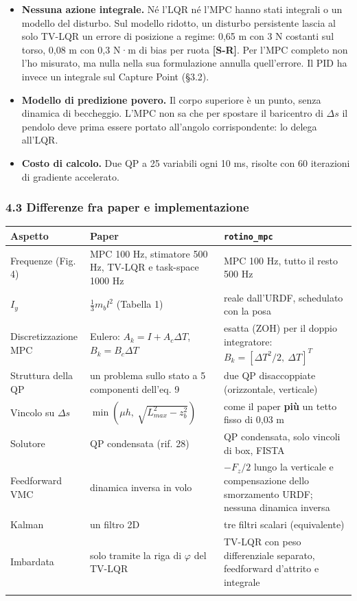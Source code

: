 \documentclass[
]{article}
\providecommand{\tightlist}{%
  \setlength{\itemsep}{0pt}\setlength{\parskip}{0pt}}
\begin{document}
\begin{itemize}
\tightlist
\item \textbf{Nessuna azione integrale.} Né l'LQR né l'MPC hanno stati integrali o un modello del disturbo. Sul modello ridotto, un disturbo persistente lascia al solo TV-LQR un errore di posizione a regime: 0,65 m con 3 N costanti sul torso, 0,08 m con 0,3 N·m di bias per ruota \textbf{[S-R]}. Per l'MPC completo non l'ho misurato, ma nulla nella sua formulazione annulla quell'errore. Il PID ha invece un integrale sul Capture Point (§3.2).
\item \textbf{Modello di predizione povero.} Il corpo superiore è un punto, senza dinamica di beccheggio. L'MPC non sa che per spostare il baricentro di \(\Delta s\) il pendolo deve prima essere portato all'angolo corrispondente: lo delega all'LQR.
\item \textbf{Costo di calcolo.} Due QP a 25 variabili ogni 10 ms, risolte con 60 iterazioni di gradiente accelerato.
\end{itemize}

\subsubsection{4.3 Differenze fra paper e implementazione}\label{43-differenze-fra-paper-e-implementazione}

\begin{longtable}[]{@{}>{\raggedright\arraybackslash}p{}>{\raggedright\arraybackslash}p{}>{\raggedright\arraybackslash}p{}@{}}
\toprule\noalign{}
Aspetto & Paper & \texttt{rotino\_mpc} \\
\midrule\noalign{}
\endhead
Frequenze (Fig. 4) & MPC 100 Hz, stimatore 500 Hz, TV-LQR e task-space 1000 Hz & MPC 100 Hz, tutto il resto 500 Hz \\
\(I_y\) & \(\tfrac13 m_b l^2\) (Tabella 1) & reale dall'URDF, schedulato con la posa \\
Discretizzazione MPC & Eulero: \(A_k = I + A_c\Delta T\), \(B_k = B_c\Delta T\) & esatta (ZOH) per il doppio integratore: \(B_k = [\Delta T^2/2,\ \Delta T]^T\) \\
Struttura della QP & un problema sullo stato a 5 componenti dell'eq. 9 & due QP disaccoppiate (orizzontale, verticale) \\
Vincolo su \(\Delta s\) & \(\min(\mu h,\ \sqrt{L_{max}^2-z_b^2})\) & come il paper \textbf{più} un tetto fisso di 0,03 m \\
Solutore & QP condensata (rif. 28) & QP condensata, solo vincoli di box, FISTA \\
Feedforward VMC & dinamica inversa in volo & \(-F_z/2\) lungo la verticale e compensazione dello smorzamento URDF; nessuna dinamica inversa \\
Kalman & un filtro 2D & tre filtri scalari (equivalente) \\
Imbardata & solo tramite la riga di \(\varphi\) del TV-LQR & TV-LQR con peso differenziale separato, feedforward d'attrito e integrale \\
\bottomrule\noalign{}
\end{longtable}
\end{document}
